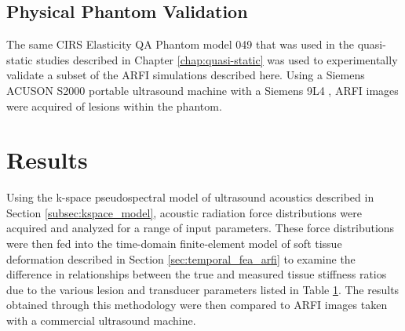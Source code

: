 		\subsection{Physical Phantom Validation}
			The same CIRS Elasticity QA Phantom model 049 that was used in the quasi-static studies described in Chapter \ref{chap:quasi-static} was used to experimentally validate a subset of the ARFI simulations described here. Using a Siemens ACUSON S2000  portable ultrasound machine with a Siemens 9L4 , ARFI images were acquired of lesions within the phantom. 

	\section{Results}
		Using the k-space pseudospectral model of ultrasound acoustics described in Section \ref{subsec:kspace_model}, acoustic radiation force distributions were acquired and analyzed for a range of input parameters. These force distributions were then fed into the time-domain finite-element model of soft tissue deformation described in Section \ref{sec:temporal_fea_arfi} to examine the difference in relationships between the true and measured tissue stiffness ratios due to the various lesion and transducer parameters listed in Table \ref{}. The results obtained through this methodology were then compared to ARFI images taken with a commercial ultrasound machine. 

